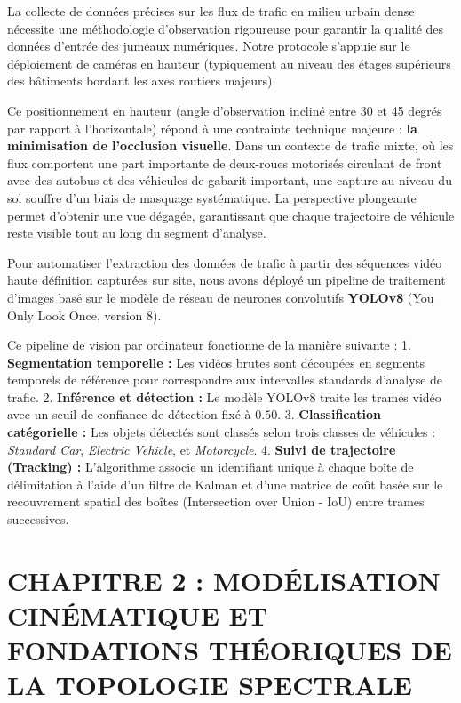 \documentclass[10pt, a4paper]{article}
\begin{document}
La collecte de données précises sur les flux de trafic en milieu urbain
dense nécessite une méthodologie d'observation rigoureuse pour garantir
la qualité des données d'entrée des jumeaux numériques. Notre protocole
s'appuie sur le déploiement de caméras en hauteur (typiquement au niveau
des étages supérieurs des bâtiments bordant les axes routiers majeurs).

Ce positionnement en hauteur (angle d'observation incliné entre 30 et 45
degrés par rapport à l'horizontale) répond à une contrainte technique
majeure : \textbf{la minimisation de l'occlusion visuelle}. Dans un
contexte de trafic mixte, où les flux comportent une part importante de
deux-roues motorisés circulant de front avec des autobus et des
véhicules de gabarit important, une capture au niveau du sol souffre
d'un biais de masquage systématique. La perspective plongeante permet
d'obtenir une vue dégagée, garantissant que chaque trajectoire de
véhicule reste visible tout au long du segment d'analyse.

Pour automatiser l'extraction des données de trafic à partir des
séquences vidéo haute définition capturées sur site, nous avons déployé
un pipeline de traitement d'images basé sur le modèle de réseau de
neurones convolutifs \textbf{YOLOv8} (You Only Look Once, version 8).

Ce pipeline de vision par ordinateur fonctionne de la manière suivante :
1. \textbf{Segmentation temporelle :} Les vidéos brutes sont découpées
en segments temporels de référence pour correspondre aux intervalles
standards d'analyse de trafic. 2. \textbf{Inférence et détection :} Le
modèle YOLOv8 traite les trames vidéo avec un seuil de confiance de
détection fixé à \(0.50\). 3. \textbf{Classification catégorielle :} Les
objets détectés sont classés selon trois classes de véhicules :
\emph{Standard Car}, \emph{Electric Vehicle}, et \emph{Motorcycle}. 4.
\textbf{Suivi de trajectoire (Tracking) :} L'algorithme associe un
identifiant unique à chaque boîte de délimitation à l'aide d'un filtre
de Kalman et d'une matrice de coût basée sur le recouvrement spatial des
boîtes (Intersection over Union - IoU) entre trames successives.

\newpage

\section{CHAPITRE 2 : MODÉLISATION CINÉMATIQUE ET FONDATIONS THÉORIQUES
DE LA TOPOLOGIE
SPECTRALE}\label{chapitre-2-moduxe9lisation-cinuxe9matique-et-fondations-thuxe9oriques-de-la-topologie-spectrale}
\end{document}
